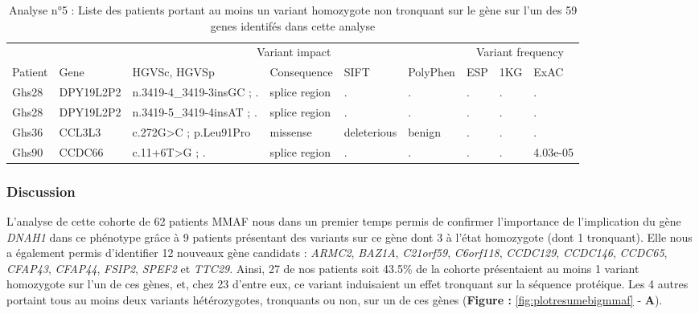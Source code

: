 \documentclass[12pt,twoside]{reedthesis}
\theoremstyle{definition}
\theoremstyle{definition}
\theoremstyle{remark}
\begin{document}
  \begin{landscape}
  \begin{longtable}[t]{lllllllll}
  \caption{\label{tab:tabgrp4moderate}Analyse n°5 : Liste des patients portant au moins un variant homozygote non tronquant sur le gène sur l'un des 59 genes identifés dans cette analyse}\\
  \toprule
  \multicolumn{1}{c}{ } & \multicolumn{1}{c}{ } & \multicolumn{4}{c}{Variant impact} & \multicolumn{3}{c}{Variant frequency} \\
  \cmidrule(l{2pt}r{2pt}){3-6} \cmidrule(l{2pt}r{2pt}){7-9}
  Patient & Gene & HGVSc, HGVSp & Consequence & SIFT & PolyPhen & ESP & 1KG & ExAC\\
  \midrule
  Ghs28 & DPY19L2P2 & n.3419-4\_3419-3insGC ; . & splice region & . & . & . & . & .\\
  Ghs28 & DPY19L2P2 & n.3419-5\_3419-4insAT ; . & splice region & . & . & . & . & .\\
  Ghs36 & CCL3L3 & c.272G>C ; p.Leu91Pro & missense & deleterious & benign & . & . & .\\
  Ghs90 & CCDC66 & c.11+6T>G ; . & splice region & . & . & . & . & 4.03e-05\\
  \bottomrule
  \end{longtable}
  \end{landscape}
  
  \newpage
  
  \newpage
  
  \subsubsection{Discussion}\label{discussion-1}
  
  L'analyse de cette cohorte de 62 patients MMAF nous dans un premier
  temps permis de confirmer l'importance de l'implication du gène
  \emph{DNAH1} dans ce phénotype grâce à 9 patients présentant des
  variants sur ce gène dont 3 à l'état homozygote (dont 1 tronquant). Elle
  nous a également permis d'identifier 12 nouveaux gène candidats :
  \emph{ARMC2}, \emph{BAZ1A}, \emph{C21orf59}, \emph{C6orf118},
  \emph{CCDC129}, \emph{CCDC146}, \emph{CCDC65}, \emph{CFAP43},
  \emph{CFAP44}, \emph{FSIP2}, \emph{SPEF2} et \emph{TTC29}. Ainsi, 27 de
  nos patients soit 43.5\% de la cohorte présentaient au moins 1 variant
  homozygote sur l'un de ces gènes, et, chez 23 d'entre eux, ce variant
  induisaient un effet tronquant sur la séquence protéique. Les 4 autres
  portaint tous au moins deux variants hétérozygotes, tronquants ou non,
  sur un de ces gènes (\textbf{Figure : }\ref{fig:plotresumebigmmaf} -
  \textbf{A}).
  
\end{document}
